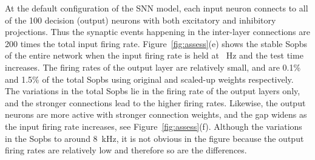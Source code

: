 At the default configuration of the SNN model, each input neuron connects to all of the 100 decision (output) neurons with both excitatory and inhibitory projections.
Thus the synaptic events happening in the inter-layer connections are 200 times the total input firing rate.
Figure~\ref{fig:assess}(e) shows the stable Sopbs of the entire network when the input firing rate is held at \DIFdelbegin {}\DIFdelend \DIFaddbegin {}\DIFaddend ~Hz and the test time increases.
The firing rates of the output layer are relatively small, and are 0.1\% and 1.5\% of the total Sopbs using original and scaled-up weights respectively.
The variations in the total Sopbs lie in the firing rate of the output layers only, and the stronger connections lead to the higher firing rates.
Likewise, the output neurons are more active with stronger connection weights, and the gap widens as the input firing rate increases, see Figure~\ref{fig:assess}(f).
Although the variations in the Sopbs \DIFdelbegin {}\DIFdelend \DIFaddbegin {}\DIFaddend to around 8~kHz, it is not obvious in the figure because the output firing rates are relatively low and therefore so are the differences.



